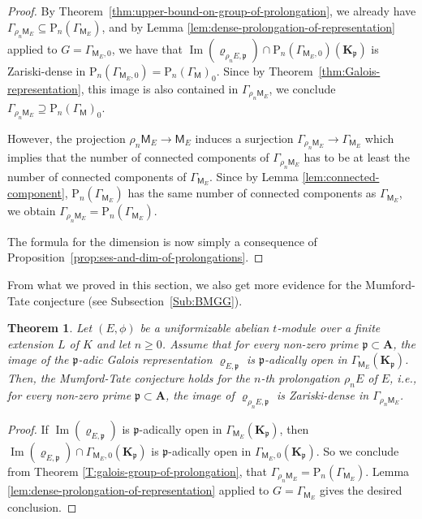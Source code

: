 \documentclass[10pt,a4paper]{amsart}
\theoremstyle{plain} %
\newtheorem{Theorem}{Theorem}[section]
\theoremstyle{definition}
\theoremstyle{remark}
\newcommand{\fp}{\mathfrak{p}}  %
\newcommand{\bA}{\mathbf{A}}
\newcommand{\bK}{\mathbf{K}}
\newcommand{\rP}[1]{\mathrm{P}_{\!#1}}
\newcommand{\mot}{\mathsf{M}}  %
\newcommand{\image}{\operatorname{Im}}
\numberwithin{equation}{subsection}
\begin{document}
\begin{proof}
By Theorem~\ref{thm:upper-bound-on-group-of-prolongation}, we already have
$\Gamma_{\rho_{n}\mot_E}\subseteq \rP{n}(\Gamma_{\mot_E})$, and by  Lemma \ref{lem:dense-prolongation-of-representation} applied to $G=\Gamma_{\mot_E,0}$, we have that 
$\image(\varrho_{\rho_nE,\fp})\cap \rP{n}(\Gamma_{\mot_E,0})(\bK_\fp)$ is Zariski-dense in $\rP{n}(\Gamma_{\mot_E,0})=\rP{n}(\Gamma_{\mot})_0$.
Since by Theorem~\ref{thm:Galois-representation}, this image is also contained in $\Gamma_{\rho_{n}\mot_E}$, we conclude $\Gamma_{\rho_{n}\mot_E}\supseteq \rP{n}(\Gamma_{\mot})_0$.

However, the projection $\rho_{n}\mot_E\to \mot_E$ induces a surjection $\Gamma_{\rho_{n}\mot_E}\to \Gamma_{\mot_E}$ which implies that the number of connected components of $\Gamma_{\rho_{n}\mot_E}$ has to be at least the number of connected components of $\Gamma_{\mot_E}$. Since by Lemma \ref{lem:connected-component}, $\rP{n}(\Gamma_{\mot_E})$ has the same number of connected components as $\Gamma_{\mot_E}$, we obtain
$\Gamma_{\rho_{n}\mot_E}=\rP{n}(\Gamma_{\mot_E})$.


The formula for the dimension is now simply a consequence of Proposition~\ref{prop:ses-and-dim-of-prolongations}.
\end{proof}

From what we proved in this section, we also get more evidence for the Mumford-Tate conjecture (see Subsection~\ref{Sub:BMGG}).

\begin{Theorem}\label{thm:evidence-Mumford-Tate-conjecture}
    Let $(E, \phi)$ be a uniformizable abelian $t$-module over a finite extension $L$ of $K$ and let $n \geq 0$. Assume that for every non-zero prime $\fp\subset \bA$, the image of the $\fp$-adic Galois representation $\varrho_{E,\fp}$ is $\fp$-adically open in $\Gamma_{\mot_E}(\bK_\fp)$.
    Then, the Mumford-Tate conjecture holds for the $n$-th prolongation $\rho_nE$ of $E$, i.e., for every non-zero prime $\fp\subset \bA$, the image of $\varrho_{\rho_nE,\fp}$ is Zariski-dense in $\Gamma_{\rho_n\mot_E}$.
\end{Theorem}

\begin{proof}
    If $\image(\varrho_{E,\fp})$ is $\fp$-adically open in $\Gamma_{\mot_E}(\bK_\fp)$, then $\image(\varrho_{E,\fp})\cap \Gamma_{\mot_E,0}(\bK_\fp)$ is $\fp$-adically open in $\Gamma_{\mot_E,0}(\bK_\fp)$. So we conclude from Theorem \ref{T:galois-group-of-prolongation}, that $\Gamma_{\rho_n\mot_E}=\rP{n}(\Gamma_{\mot_E})$. Lemma \ref{lem:dense-prolongation-of-representation} applied to $G=\Gamma_{\mot_E}$ gives the desired conclusion.
\end{proof}
\end{document}
